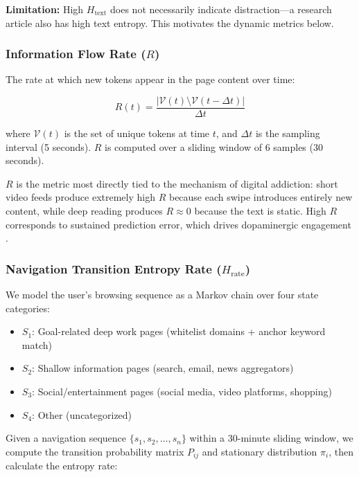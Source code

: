 \documentclass[10pt,letterpaper]{article}
\begin{document}
\textbf{Limitation:} High $H_{\text{text}}$ does not necessarily indicate distraction---a research article also has high text entropy. This motivates the dynamic metrics below.

\subsubsection{Information Flow Rate ($R$)}

The rate at which new tokens appear in the page content over time:

\begin{equation}
R(t) = \frac{|\mathcal{V}(t) \setminus \mathcal{V}(t - \Delta t)|}{\Delta t}
\end{equation}

where $\mathcal{V}(t)$ is the set of unique tokens at time $t$, and $\Delta t$ is the sampling interval (5 seconds). $R$ is computed over a sliding window of 6 samples (30 seconds).

$R$ is the metric most directly tied to the mechanism of digital addiction: short video feeds produce extremely high $R$ because each swipe introduces entirely new content, while deep reading produces $R \approx 0$ because the text is static. High $R$ corresponds to sustained prediction error, which drives dopaminergic engagement \cite{schultz2016dopamine}.

\subsubsection{Navigation Transition Entropy Rate ($H_{\text{rate}}$)}

We model the user's browsing sequence as a Markov chain over four state categories:

\begin{itemize}[noitemsep]
    \item $S_1$: Goal-related deep work pages (whitelist domains + anchor keyword match)
    \item $S_2$: Shallow information pages (search, email, news aggregators)
    \item $S_3$: Social/entertainment pages (social media, video platforms, shopping)
    \item $S_4$: Other (uncategorized)
\end{itemize}

Given a navigation sequence $\{s_1, s_2, \ldots, s_n\}$ within a 30-minute sliding window, we compute the transition probability matrix $P_{ij}$ and stationary distribution $\pi_i$, then calculate the entropy rate:
\end{document}

